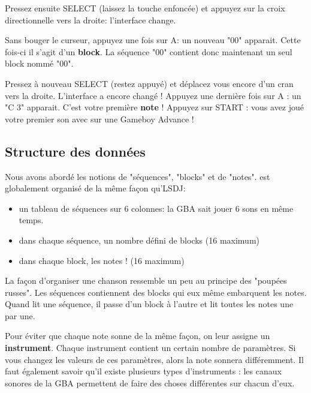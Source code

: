 Pressez ensuite SELECT (laissez la touche enfoncée) et appuyez sur la croix directionnelle vers la droite: l'interface change.


Sans bouger le curseur, appuyez une fois sur A: un nouveau "00" apparait.
Cette fois-ci il s'agit d'un {\bf block}. La séquence "00" contient donc maintenant un seul block nommé "00".


Pressez à nouveau SELECT (restez appuyé) et déplacez vous encore d'un cran vers la droite.
L'interface a encore changé !
Appuyez une dernière fois sur A : un "C 3" apparait.
C'est votre première {\bf note} !
Appuyez sur START : vous avez joué votre premier son avec \FAT sur une Gameboy Advance !


\subsection{Structure des données}

Nous avons abordé les notions de "séquences", "blocks" et de "notes".
\FAT est globalement organisé de la même façon qu'LSDJ:
\medskip

\begin{itemize}
  \item{un tableau de séquences sur 6 colonnes: la GBA sait jouer 6 sons en même temps.}
  \item{dans chaque séquence, un nombre défini de blocks (16 maximum)}
  \item{dans chaque block, les notes ! (16 maximum)}
\end{itemize}
\medskip

La façon d'organiser une chanson ressemble un peu au principe des "poupées russes".
Les séquences contiennent des blocks qui eux même embarquent les notes.
Quand \FAT lit une séquence, il passe d'un block à l'autre et lit toutes les notes une par une.
\medskip

Pour éviter que chaque note sonne de la même façon, on leur assigne un {\bf instrument}.
Chaque instrument contient un certain nombre de paramètres.
Si vous changez les valeurs de ces paramètres, alors la note sonnera différemment.
Il faut également savoir qu'il existe plusieurs types d'instruments : les canaux sonores de la GBA permettent de faire des choses différentes sur chacun d'eux.

